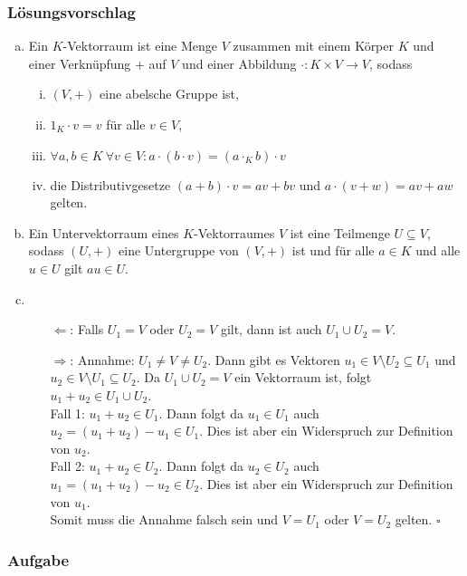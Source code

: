 \documentclass[a4paper,11pt]{scrartcl}
\newcounter{auf}
\newcommand{\Aufgabe}%
        {\addtocounter{auf}{1} \subsubsection*{\rmfamily  Aufgabe \theauf \hspace{1em}} }
\begin{document}
\subsubsection*{Lösungsvorschlag}
\begin{enumerate}[a)]
\item Ein $K$-Vektorraum ist eine Menge $V$ zusammen mit einem Körper $K$ und einer Verknüpfung $+$ auf $V$ und einer Abbildung $\cdot:K\times V \to V$, sodass
\begin{enumerate}[i)]
\item $(V,+)$ eine abelsche Gruppe ist,
\item $1_K\cdot v=v$ für alle $v\in V$,
\item $\forall a,b \in K \ \forall v \in V: a\cdot (b \cdot v)=(a\cdot_K b)\cdot v$
\item die Distributivgesetze $(a+b)\cdot v=av+bv$ und $a\cdot (v+w)=av+aw$ gelten.
\end{enumerate}
\item Ein Untervektorraum eines $K$-Vektorraumes $V$ ist eine Teilmenge $U \subseteq V$, sodass $(U,+)$ eine Untergruppe von $(V,+)$ ist und für alle $a\in K$ und alle $u\in U$ gilt $au \in U$.
\item 
\begin{itemize}
\item[$\Leftarrow$:] Falls $U_1=V$ oder $U_2=V$ gilt, dann ist auch $U_1\cup U_2=V$.
\item[$\Rightarrow$:] Annahme: $U_1\ne V \ne U_2$. Dann gibt es Vektoren $u_1 \in V\setminus U_2 \subseteq U_1$ und $u_2 \in V\setminus U_1 \subseteq U_2$. Da $U_1 \cup U_2=V$ ein Vektorraum ist, folgt $u_1+u_2 \in U_1\cup U_2$.\\
Fall 1: $u_1+u_2 \in U_1$. Dann folgt da $u_1 \in U_1$ auch $u_2=(u_1+u_2)-u_1 \in U_1$. Dies ist aber ein Widerspruch zur Definition von $u_2$.\\
Fall 2: $u_1+u_2 \in U_2$. Dann folgt da $u_2 \in U_2$ auch $u_1=(u_1+u_2)-u_2 \in U_2$. Dies ist aber ein Widerspruch zur Definition von $u_1$.\\
Somit muss die Annahme falsch sein und $V=U_1$ oder $V=U_2$ gelten. \hfill $\square$
\end{itemize}
\end{enumerate}



\newpage
\Aufgabe
\end{document}
